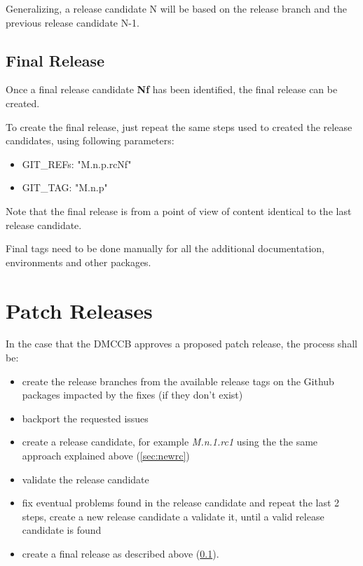 Generalizing, a release candidate N will be based on the release branch and the previous release candidate N-1.
 

\subsection{Final Release} \label{sec:finalrelease}

Once a final release candidate \textbf{Nf} has been identified, the final release can be created.

To create the final release, just repeat the same steps used to created the release candidates, using following parameters:

\begin{itemize}
\item GIT\_REFs: "M.n.p.rcNf"
\item GIT\_TAG: "M.n.p"
\end{itemize}

Note that the final release is from a point of view of content identical to the last release candidate.

Final tags need to be done manually for all the additional documentation, environments and other packages.

\newpage

\section{Patch Releases} \label{sec:patchreleases}

In the case that the DMCCB approves a proposed patch release, the process shall be:

\begin{itemize}
\item create the release branches from the available release tags on the Github packages impacted by the fixes (if they don't exist)
\item backport the requested issues
\item create a release candidate, for example \textit{M.n.1.rc1} using the the same approach explained above (\ref{sec:newrc})
\item validate the release candidate
\item fix eventual problems found in the release candidate and repeat the last 2 steps, create a new release candidate a validate it, until a valid release candidate is found
\item create a final release as described above (\ref{sec:finalrelease}).
\end{itemize}


